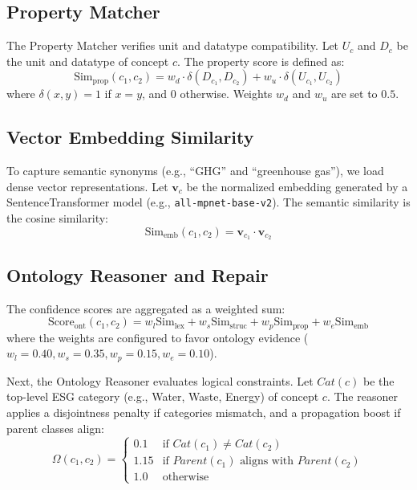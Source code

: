 \documentclass[journal,compsoc]{IEEEtran}
\begin{document}
\begin{itemize}
\begin{table}[t]
\begin{itemize}
\subsection{Property Matcher}
The Property Matcher verifies unit and datatype compatibility. Let $U_c$ and $D_c$ be the unit and datatype of concept $c$. The property score is defined as:
\begin{equation}
\text{Sim}_{\text{prop}}(c_1, c_2) = w_d \cdot \delta(D_{c_1}, D_{c_2}) + w_u \cdot \delta(U_{c_1}, U_{c_2})
\end{equation}
where $\delta(x, y) = 1$ if $x = y$, and $0$ otherwise. Weights $w_d$ and $w_u$ are set to $0.5$.

\subsection{Vector Embedding Similarity}
To capture semantic synonyms (e.g., ``GHG'' and ``greenhouse gas''), we load dense vector representations. Let $\mathbf{v}_{c}$ be the normalized embedding generated by a SentenceTransformer model (e.g., \texttt{all-mpnet-base-v2}). The semantic similarity is the cosine similarity:
\begin{equation}
\text{Sim}_{\text{emb}}(c_1, c_2) = \mathbf{v}_{c_1} \cdot \mathbf{v}_{c_2}
\end{equation}

\subsection{Ontology Reasoner and Repair}
The confidence scores are aggregated as a weighted sum:
\begin{equation}
\text{Score}_{\text{ont}}(c_1, c_2) = w_{l}\text{Sim}_{\text{lex}} + w_{s}\text{Sim}_{\text{struc}} + w_{p}\text{Sim}_{\text{prop}} + w_{e}\text{Sim}_{\text{emb}}
\label{eq:weighted}
\end{equation}
where the weights are configured to favor ontology evidence ($w_l = 0.40, w_s = 0.35, w_p = 0.15, w_e = 0.10$).

Next, the Ontology Reasoner evaluates logical constraints. Let $Cat(c)$ be the top-level ESG category (e.g., Water, Waste, Energy) of concept $c$. The reasoner applies a disjointness penalty if categories mismatch, and a propagation boost if parent classes align:
\begin{equation}
\Omega(c_1, c_2) = 
\begin{cases} 
0.1 & \text{if } Cat(c_1) \neq Cat(c_2) \\
1.15 & \text{if } Parent(c_1) \text{ aligns with } Parent(c_2) \\
1.0 & \text{otherwise}
\end{cases}
\end{equation}


\end{itemize}
\end{table}
\end{itemize}
\end{document}
